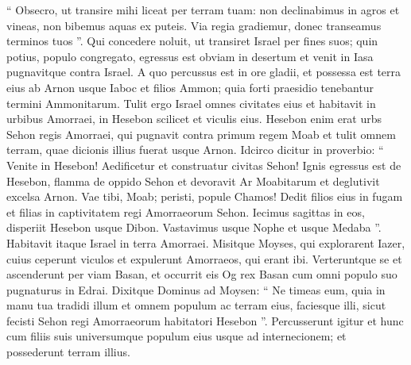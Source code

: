\begin{biblechapter}
\begin{biblechapter}
\begin{biblechapter}
\begin{biblechapter}
\begin{biblechapter}
\begin{biblechapter}
\begin{biblechapter}
\begin{biblechapter}
\begin{biblechapter}
\begin{biblechapter}
\begin{biblechapter}
\begin{biblechapter}
\begin{biblechapter}
\begin{biblechapter}
\begin{biblechapter}
\begin{biblechapter}
\begin{biblechapter}
\begin{biblechapter}
\begin{biblechapter}
\begin{biblechapter}
\begin{biblechapter}
\verse “ Obsecro, ut transire mihi liceat per terram tuam: non declinabimus in agros et vineas, non bibemus aquas ex puteis. Via regia gradiemur, donec transeamus terminos tuos ”. 
\verse Qui concedere noluit, ut transiret Israel per fines suos; quin potius, populo congregato, egressus est obviam in desertum et venit in Iasa pugnavitque contra Israel. 
\verse A quo percussus est in ore gladii, et possessa est terra eius ab Arnon usque Iaboc et filios Ammon; quia forti praesidio tenebantur termini Ammonitarum.
 \verse Tulit ergo Israel omnes civitates eius et habitavit in urbibus Amorraei, in Hesebon scilicet et viculis eius. 
\verse Hesebon enim erat urbs Sehon regis Amorraei, qui pugnavit contra primum regem Moab et tulit omnem terram, quae dicionis illius fuerat usque Arnon. 
\verse Idcirco dicitur in proverbio:
 “ Venite in Hesebon!
 Aedificetur et construatur civitas Sehon!
 \verse Ignis egressus est de Hesebon,
 flamma de oppido Sehon
 et devoravit Ar Moabitarum
 et deglutivit excelsa Arnon.
 \verse Vae tibi, Moab;
 peristi, popule Chamos!
 Dedit filios eius in fugam
 et filias in captivitatem
 regi Amorraeorum Sehon.
 \verse Iecimus sagittas in eos,
 disperiit Hesebon usque Dibon.
 Vastavimus usque Nophe
 et usque Medaba ”.
 \verse Habitavit itaque Israel in terra Amorraei. 
\verse Misitque Moyses, qui explorarent Iazer, cuius ceperunt viculos et expulerunt Amorraeos, qui erant ibi.
 \verse Verteruntque se et ascenderunt per viam Basan, et occurrit eis Og rex Basan cum omni populo suo pugnaturus in Edrai. 
\verse Dixitque Dominus ad Moysen: “ Ne timeas eum, quia in manu tua tradidi illum et omnem populum ac terram eius, faciesque illi, sicut fecisti Sehon regi Amorraeorum habitatori Hesebon ”. 
 \verse Percusserunt igitur et hunc cum filiis suis universumque populum eius usque ad internecionem; et possederunt terram illius.
 

\end{biblechapter}
\end{biblechapter}
\end{biblechapter}
\end{biblechapter}
\end{biblechapter}
\end{biblechapter}
\end{biblechapter}
\end{biblechapter}
\end{biblechapter}
\end{biblechapter}
\end{biblechapter}
\end{biblechapter}
\end{biblechapter}
\end{biblechapter}
\end{biblechapter}
\end{biblechapter}
\end{biblechapter}
\end{biblechapter}
\end{biblechapter}
\end{biblechapter}
\end{biblechapter}

